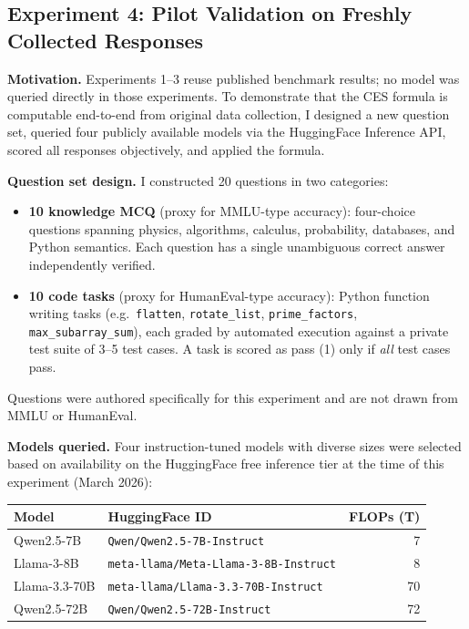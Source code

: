\documentclass[12pt]{article}
\begin{document}
\subsection{Experiment 4: Pilot Validation on Freshly Collected Responses}
\label{sec:exp4-pilot}

\textbf{Motivation.} Experiments 1--3 reuse published benchmark results; no model was queried directly in those experiments. To demonstrate that the CES formula is computable end-to-end from original data collection, I designed a new question set, queried four publicly available models via the HuggingFace Inference API, scored all responses objectively, and applied the formula.

\textbf{Question set design.} I constructed 20 questions in two categories:

\begin{itemize}
\item \textbf{10 knowledge MCQ} (proxy for MMLU-type accuracy): four-choice questions spanning physics, algorithms, calculus, probability, databases, and Python semantics. Each question has a single unambiguous correct answer independently verified.
\item \textbf{10 code tasks} (proxy for HumanEval-type accuracy): Python function writing tasks (e.g.\ \texttt{flatten}, \texttt{rotate\_list}, \texttt{prime\_factors}, \texttt{max\_subarray\_sum}), each graded by automated execution against a private test suite of 3--5 test cases. A task is scored as pass (1) only if \textit{all} test cases pass.
\end{itemize}

Questions were authored specifically for this experiment and are not drawn from MMLU or HumanEval.

\textbf{Models queried.} Four instruction-tuned models with diverse sizes were selected based on availability on the HuggingFace free inference tier at the time of this experiment (March 2026):

\begin{center}
\begin{tabular}{llr}
\toprule
\textbf{Model} & \textbf{HuggingFace ID} & \textbf{FLOPs (T)} \\
\midrule
Qwen2.5-7B    & \texttt{Qwen/Qwen2.5-7B-Instruct}              & 7 \\
Llama-3-8B    & \texttt{meta-llama/Meta-Llama-3-8B-Instruct}   & 8 \\
Llama-3.3-70B & \texttt{meta-llama/Llama-3.3-70B-Instruct}     & 70 \\
Qwen2.5-72B   & \texttt{Qwen/Qwen2.5-72B-Instruct}             & 72 \\
\bottomrule
\end{tabular}
\end{center}
\end{document}
